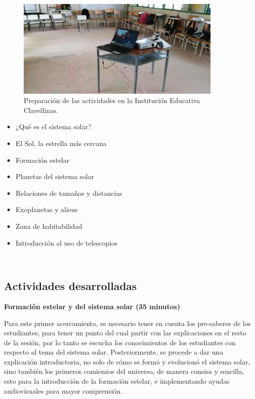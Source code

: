 \documentclass[a4paper,10pt]{article}
\begin{document}
\begin{figure}[H]
    \centering
    \includegraphics[width=10cm]{clavellinas/clave2.jpeg}
    \caption{Preparación de las actividades en la Institución Educativa Clavellinas.}
    \label{fig:my_label}
\end{figure}
\begin{itemize}
    \item ¿Qué es el sistema solar?
    \item El Sol, la estrella más cercana
    \item Formación estelar
    \item Planetas del sistema solar
    \item Relaciones de tamaños y distancias
    \item Exoplanetas y aliens
    \item Zona de habitabilidad
    \item Introducción al uso de telescopios
\end{itemize}

\
\subsection{Actividades desarrolladas}

\noindent \textbf{Formación estelar y del sistema solar (35 minutos)}
\vspace{2mm}

\noindent Para este primer acercamiento, es necesario tener en cuenta los pre-saberes de los estudiantes, para tener un punto del cual partir con las explicaciones en el resto de la sesión, por lo tanto se escucha los conocimientos de los estudiantes con respecto al tema del sistema solar. Posteriormente, se procede a dar una explicación introductoria, no solo de cómo se formó y evolucionó el sistema solar, sino también los primeros comienzos del universo, de manera consisa y sencilla, esto para la introducción de la formación estelar, e implementando ayudas audiovisuales para mayor comprensión.
\end{document}
